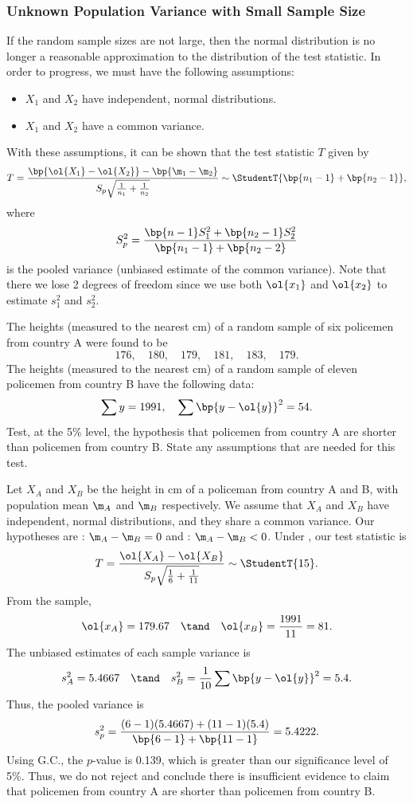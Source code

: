 \subsubsection{Unknown Population Variance with Small Sample Size}

If the random sample sizes are not large, then the normal distribution is no longer a reasonable approximation to the distribution of the test statistic. In order to progress, we must have the following assumptions:
\begin{itemize}
    \item $X_1$ and $X_2$ have independent, normal distributions.
    \item $X_1$ and $X_2$ have a common variance.
\end{itemize}
With these assumptions, it can be shown that the test statistic $T$ given by \[T = \frac{\bp{\ol{X_1} - \ol{X_2}} - \bp{\m_1 - \m_2}}{S_p \sqrt{\frac1{n_1} + \frac1{n_2}}} \sim \StudentT{\bp{n_1 - 1} + \bp{n_2 - 1}},\] where \[S^2_p = \frac{\bp{n-1} S_1^2 + \bp{n_2 - 1} S_2^2}{\bp{n_1 - 1} + \bp{n_2 - 2}}\] is the pooled variance (unbiased estimate of the common variance). Note that there we lose 2 degrees of freedom since we use both $\ol{x_1}$ and $\ol{x_2}$ to estimate $s_1^2$ and $s_2^2$.

\begin{sample}
    The heights (measured to the nearest cm) of a random sample of six policemen from country A were found to be \[176, \quad 180, \quad 179, \quad 181, \quad 183, \quad 179.\] The heights (measured to the nearest cm) of a random sample of eleven policemen from country B have the following data: \[\sum y = 1991, \quad \sum \bp{y - \ol{y}}^2 = 54.\] Test, at the 5\% level, the hypothesis that policemen from country A are shorter than policemen from country B. State any assumptions that are needed for this test.
\end{sample}
\begin{sampans}
    Let $X_A$ and $X_B$ be the height in cm of a policeman from country A and B, with population mean $\m_A$ and $\m_B$ respectively. We assume that $X_A$ and $X_B$ have independent, normal distributions, and they share a common variance. Our hypotheses are \nullhyp: $\m_A - \m_B = 0$ and \althyp: $\m_A - \m_B < 0$. Under \nullhyp, our test statistic is \[T = \frac{\ol{X_A} - \ol{X_B}}{S_p \sqrt{\frac16 + \frac1{11}}} \sim \StudentT{15}.\] From the sample, \[\ol{x_A} = 179.67 \quad \tand \quad \ol{x_B} = \frac{1991}{11} = 81.\] The unbiased estimates of each sample variance is \[s_A^2 = 5.4667 \quad \tand \quad s_B^2 = \frac1{10} \sum \bp{y - \ol{y}}^2 = 5.4.\] Thus, the pooled variance is \[s_p^2 = \frac{(6-1)(5.4667) + (11-1)(5.4)}{\bp{6-1} + \bp{11-1}} = 5.4222.\] Using G.C., the $p$-value is 0.139, which is greater than our significance level of 5\%. Thus, we do not reject \nullhyp{} and conclude there is insufficient evidence to claim that policemen from country A are shorter than policemen from country B.
\end{sampans}

